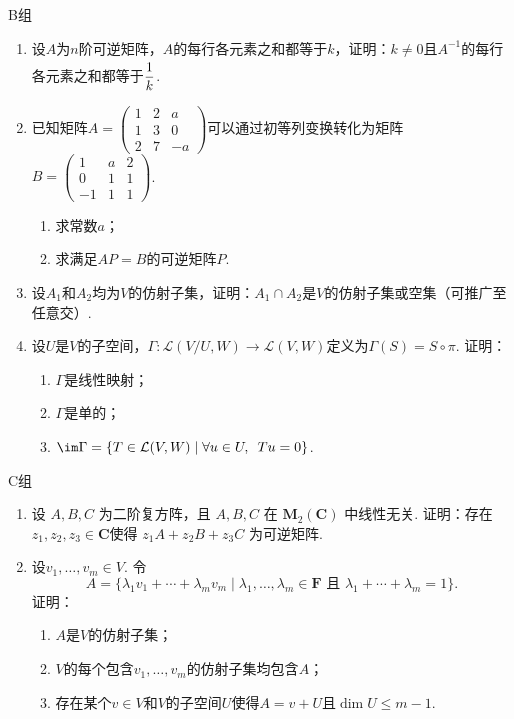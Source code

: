 \centerline{\heiti B组}
\begin{enumerate}
    \item 设$A$为$n$阶可逆矩阵，$A$的每行各元素之和都等于$k$，证明：$k \neq 0$且$A^{-1}$的每行各元素之和都等于$\vphantom{\cfrac{1}{k}}\dfrac{1}{k}$.

    \item 已知矩阵$A=\begin{pmatrix}1 & 2 & a  \\
               1 & 3 & 0  \\
               2 & 7 & -a\end{pmatrix}$可以通过初等列变换转化为矩阵$B=\begin{pmatrix}1  & a & 2 \\
               0  & 1 & 1 \\
               -1 & 1 & 1\end{pmatrix}$.
          \begin{enumerate}
              \item 求常数$a$；

              \item 求满足$AP=B$的可逆矩阵$P$.
          \end{enumerate}

    \item 设$A_1$和$A_2$均为$V$的仿射子集，证明：$A_1\cap A_2$是$V$的仿射子集或空集（可推广至任意交）.

    \item 设$U$是$V$的子空间，$\Gamma:\mathcal{L}(V/U,W)\to \mathcal{L}(V,W)$定义为$\Gamma(S)=S\circ\pi$. 证明：
          \begin{enumerate}
              \item $\Gamma$是线性映射；

              \item $\Gamma$是单的；

              \item $\im\Gamma=\{T\in \mathcal{L}(V,W) \mid \forall u\in U,\enspace Tu=0\}$.
          \end{enumerate}
\end{enumerate}

\centerline{\heiti C组}
\begin{enumerate}
    \item 设 $A,B,C$ 为二阶复方阵，且 $A,B,C$ 在 $\mathbf{M}_2(\mathbf{C})$ 中线性无关. 证明：存在$z_1,z_2,z_3 \in \mathbf{C}$使得 $z_1A+z_2B+z_3C$ 为可逆矩阵.

    \item 设$v_1,\ldots,v_m\in V$. 令
          \[A=\{\lambda_1v_1+\cdots+\lambda_mv_m \mid \lambda_1,\ldots,\lambda_m\in\mathbf{F}\text{~且~}\lambda_1+\cdots+\lambda_m=1\}.\]
          证明：
          \begin{enumerate}
              \item $A$是$V$的仿射子集；

              \item $V$的每个包含$v_1,\ldots,v_m$的仿射子集均包含$A$；

              \item 存在某个$v\in V$和$V$的子空间$U$使得$A=v+U$且$\dim U\leqslant m-1$.
          \end{enumerate}
\end{enumerate}
